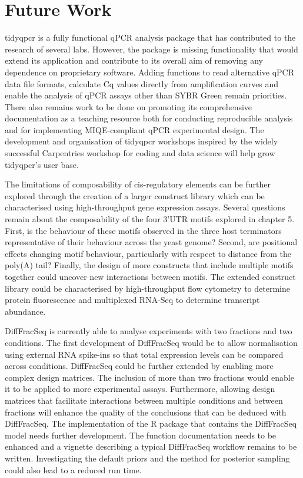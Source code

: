 \documentclass[../main.tex]{subfiles}
\begin{document}
\section{Future Work}

tidyqpcr is a fully functional qPCR analysis package that has contributed to the research of several labs. 
However, the package is missing functionality that would extend its application and contribute to its overall aim of removing any dependence on proprietary software. 
Adding functions to read alternative qPCR data file formats, calculate Cq values directly from amplification curves and enable the analysis of qPCR assays other than SYBR Green remain priorities.
There also remains work to be done on promoting its comprehensive documentation as a teaching resource both for conducting reproducible analysis and for implementing MIQE-compliant qPCR experimental design.
The development and organisation of tidyqpcr workshops inspired by the widely successful Carpentries workshop for coding and data science will help grow tidyqpcr's user base.

The limitations of composability of cis-regulatory elements can be further explored through the creation of a larger construct library which can be characterised using high-throughput gene expression assays.
Several questions remain about the composability of the four 3'UTR motifs explored in chapter 5.
First, is the behaviour of these motifs observed in the three host terminators representative of their behaviour across the yeast genome?
Second, are positional effects changing motif behaviour, particularly with respect to distance from the poly(A) tail?
Finally, the design of more constructs that include multiple motifs together could uncover new interactions between motifs.
The extended construct library could be characterised by high-throughput flow cytometry to determine protein fluorescence and multiplexed RNA-Seq to determine transcript abundance. 

DiffFracSeq is currently able to analyse experiments with two fractions and two conditions.
The first development of DiffFracSeq would be to allow normalisation using external RNA spike-ins so that total expression levels can be compared across conditions.
DiffFracSeq could be further extended by enabling more complex design matrices.
The inclusion of more than two fractions would enable it to be applied to more experimental assays.
Furthermore, allowing design matrices that facilitate interactions between multiple conditions and between fractions will enhance the quality of the conclusions that can be deduced with DiffFracSeq.
The implementation of the R package that contains the DiffFracSeq model needs further development. 
The function documentation needs to be enhanced and a vignette describing a typical DiffFracSeq workflow remains to be written.
Investigating the default priors and the method for posterior sampling could also lead to a reduced run time.
\end{document}
